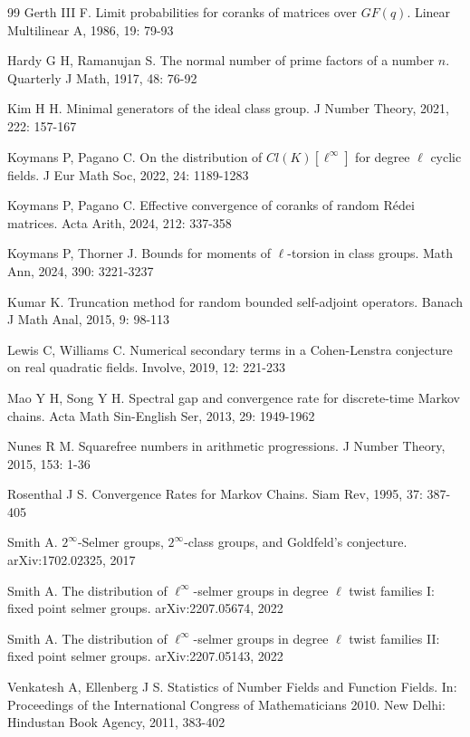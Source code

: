\documentclass[a4]{amsart}
\theoremstyle{remark} \newtheorem{remark}[theorem]{Remark}
\begin{document}
\begin{thebibliography}{99}
Gerth III F. Limit probabilities for coranks of matrices over $GF(q)$. Linear  Multilinear A, 1986, 19: 79-93

Hardy G H, Ramanujan S. The normal number of prime factors of a number $n$. Quarterly J Math, 1917, 48: 76-92

Kim H H. Minimal generators of the ideal class group. J Number Theory, 2021, 222: 157-167

Koymans P, Pagano C. On the distribution of $Cl(K)[\ell^\infty]$ for degree $\ell$ cyclic fields. J Eur Math Soc, 2022, 24: 1189-1283

Koymans P, Pagano C. Effective convergence of coranks of random R\'edei matrices. Acta Arith, 2024, 212: 337-358

Koymans P, Thorner J. Bounds for moments of $\ell $-torsion in class groups. Math Ann, 2024, 390: 3221-3237

Kumar K. Truncation method for random bounded self-adjoint operators. Banach J Math Anal, 2015, 9: 98-113

Lewis C, Williams C. Numerical secondary terms in a Cohen-Lenstra conjecture on real quadratic fields. Involve, 2019, 12: 221-233

Mao Y H, Song Y H. Spectral gap and convergence rate for discrete-time Markov chains. Acta Math Sin-English Ser, 2013, 29: 1949-1962

Nunes R M. Squarefree numbers in arithmetic progressions. J Number Theory, 2015, 153: 1-36

Rosenthal J S. Convergence Rates for Markov Chains. Siam Rev, 1995, 37: 387-405

Smith A. $2^\infty$-Selmer groups, $2^\infty$-class groups, and Goldfeld's conjecture. arXiv:1702.02325, 2017

Smith A. The distribution of $\ell^\infty$-selmer groups in degree $\ell$ twist families I: fixed point selmer groups. arXiv:2207.05674, 2022

Smith A. The distribution of $\ell^\infty$-selmer groups in degree $\ell$ twist families II: fixed point selmer groups. arXiv:2207.05143, 2022

Venkatesh A, Ellenberg J S. Statistics of Number Fields and Function Fields. In: Proceedings of the International Congress of Mathematicians 2010. New Delhi: Hindustan Book Agency, 2011, 383-402


\end{thebibliography}
\end{document}
